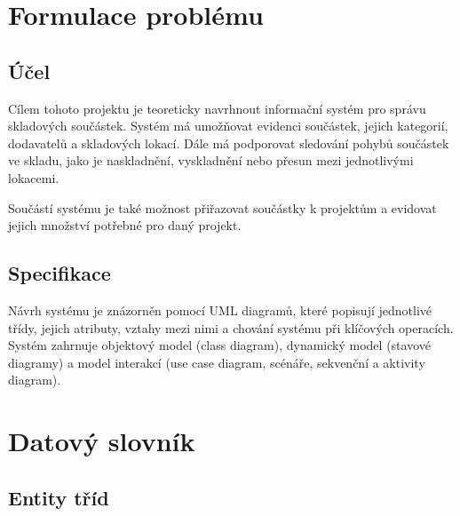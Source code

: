\chapter{Formulace problému}

\section{Účel}

Cílem tohoto projektu je teoreticky navrhnout informační systém pro správu skladových
součástek. Systém má umožňovat evidenci součástek, jejich kategorií, dodavatelů
a skladových lokací. Dále má podporovat sledování pohybů součástek ve skladu,
jako je naskladnění, vyskladnění nebo přesun mezi jednotlivými lokacemi.

Součástí systému je také možnost přiřazovat součástky k projektům a evidovat
jejich množství potřebné pro daný projekt.

\section{Specifikace}

Návrh systému je znázorněn pomocí UML diagramů, které popisují jednotlivé třídy,
jejich atributy, vztahy mezi nimi a chování systému při klíčových operacích.
Systém zahrnuje objektový model (class diagram), dynamický model (stavové diagramy)
a model interakcí (use case diagram, scénáře, sekvenční a aktivity diagram).

\chapter{Datový slovník}

\section{Entity tříd}

